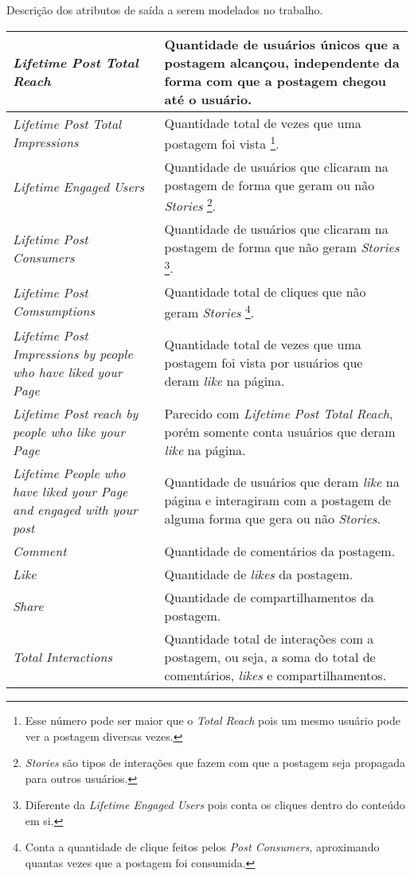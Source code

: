
\begin{quadro}[H]
	\centering
	\caption{Descrição dos atributos de saída a serem modelados no trabalho.\label{qua:descBaseFacebookSaida}}
	\small
	\begin{minipage}{\paperwidth}
	\begin{tabular}{|p{7cm}|p{7cm}|}
        		\hline
		\textit{Lifetime Post Total Reach} & Quantidade de usuários únicos que a postagem alcançou, independente da forma com que a postagem chegou até o usuário. \\ \hline
		\textit{Lifetime Post Total Impressions} & Quantidade total de vezes que uma postagem foi vista \footnote{Esse número pode ser maior que o \textit{Total Reach} pois um mesmo usuário pode ver a postagem diversas vezes.}. \\ \hline
		\textit{Lifetime Engaged Users} & Quantidade de usuários que clicaram na postagem de forma que geram ou não \textit{Stories} \footnote{\textit{Stories} são tipos de interações que fazem com que a postagem seja propagada para outros usuários.}. \\ \hline
		\textit{Lifetime Post Consumers} & Quantidade de usuários que clicaram na postagem de forma que não geram \textit{Stories} \footnote{Diferente da \textit{Lifetime Engaged Users} pois conta os cliques dentro do conteúdo em si.}. \\ \hline
		\textit{Lifetime Post Comsumptions} & Quantidade total de cliques que não geram \textit{Stories} \footnote{Conta a quantidade de clique feitos pelos \textit{Post Consumers}, aproximando quantas vezes que a postagem foi consumida.}. \\ \hline
		\textit{Lifetime Post Impressions by people who have liked your Page} & Quantidade total de vezes que uma postagem foi vista por usuários que deram \textit{like} na página. \\ \hline
		\textit{Lifetime Post reach by people who like your Page} & Parecido com \textit{Lifetime Post Total Reach}, porém somente conta usuários que deram \textit{like} na página. \\ \hline
		\textit{Lifetime People who have liked your Page and engaged with your post} & Quantidade de usuários que deram \textit{like} na página e interagiram com a postagem de alguma forma que gera ou não \textit{Stories}. \\ \hline
		\textit{Comment} & Quantidade de comentários da postagem. \\ \hline
		\textit{Like} & Quantidade de \textit{likes} da postagem. \\ \hline
		\textit{Share} & Quantidade de compartilhamentos da postagem. \\ \hline
		\textit{Total Interactions} & Quantidade total de interações com a postagem, ou seja, a soma do total de comentários, \textit{likes} e compartilhamentos. \\ \hline
    	\end{tabular}
    	\end{minipage}
\end{quadro}
